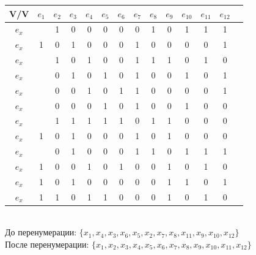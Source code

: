 \documentclass[12pt,a4paper]{report}
\begin{document}
\begin{tabular}{|c|c|c|c|c|c|c|c|c|c|c|c|c|c|} 
    \hline
    V/V & $e_{1}$ & $e_{2}$ & $e_{3}$ & $e_{4}$ & $e_{5}$ & $e_{6}$ & $e_{7}$ & $e_{8}$ & $e_{9}$ & $e_{10}$ & $e_{11}$ & $e_{12}$ \\
    \hline  
    $e_x$ &   &	1 &	0 &	0 &	0 &	0 &	0 &	1 &	0 &	1 &	1 &	1 \\
    \hline
    $e_x$ & 1 &	0 &	1 &	0 &	0 &	0 &	1 &	0 &	0 &	0 &	0 &	1 \\
    \hline
    $e_x$ &   &	1 &	0 &	1 &	0 &	0 &	1 &	1 &	1 &	0 &	1 &	0 \\
    \hline
    $e_x$ &   &	0 &	1 &	0 &	1 &	0 &	1 &	0 &	0 &	1 &	0 &	1 \\
    \hline
    $e_x$ &   &	0 &	0 &	1 &	0 &	1 &	1 &	0 &	0 &	0 &	0 &	1 \\
    \hline
    $e_x$ &   &	0 &	0 &	0 &	1 &	0 &	1 &	0 &	0 &	1 &	0 &	0 \\
    \hline
    $e_x$ &   &	1 &	1 &	1 &	1 &	1 &	0 &	1 &	1 &	0 &	0 &	0 \\
    \hline
    $e_x$ & 1 &	0 &	1 &	0 &	0 &	0 &	1 &	0 &	1 &	0 &	0 &	0 \\
    \hline
    $e_x$ &   &	0 &	1 &	0 &	0 &	0 &	1 &	1 &	0 &	1 &	1 &	1 \\
    \hline
    $e_x$ & 1 &	0 &	0 &	1 &	0 &	1 &	0 &	0 &	1 &	0 &	1 &	0 \\
    \hline
    $e_x$ & 1 &	0 &	1 &	0 &	0 &	0 &	0 &	0 &	1 &	1 &	0 &	1 \\
    \hline
    $e_x$ & 1 &	1 &	0 &	1 &	1 &	0 &	0 &	0 &	1 &	0 &	1 &	0 \\
    \hline
\end{tabular}\\
\hfill\break
До перенумерации: $\{x_{1}, x_{4}, x_{3}, x_{6}, x_{5}, x_{2}, x_{7}, x_{8}, x_{11}, x_{9}, x_{10}, x_{12}\}$\\
После перенумерации: $\{x_{1}, x_{2}, x_{3}, x_{4}, x_{5}, x_{6}, x_{7}, x_{8}, x_{9}, x_{10}, x_{11}, x_{12}\}$
\end{document}
